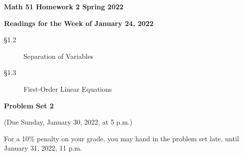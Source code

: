 \documentclass[12pt]{amsart}
\begin{document}
\thispagestyle{empty}
\noindent
\textbf{Math 51 \hfill Homework 2 \hfill Spring 2022}

\bigskip
\bigskip

\centerline{\textbf{Readings for the Week of January 24, 2022}}

\medskip
    \begin{description}
    \item[\S 1.2] Separation of Variables
    \item[\S 1.3] First-Order Linear Equations
    \end{description}

 \bigskip
\noindent
\centerline{\textbf{Problem Set 2}}
\centerline{(Due Sunday, January 30, 2022, at 5 p.m.)}

\medskip

\noindent
For a 10\% penalty on your grade, you may hand in the problem set late, until January 31, 2022, 11 p.m.
\end{document}
